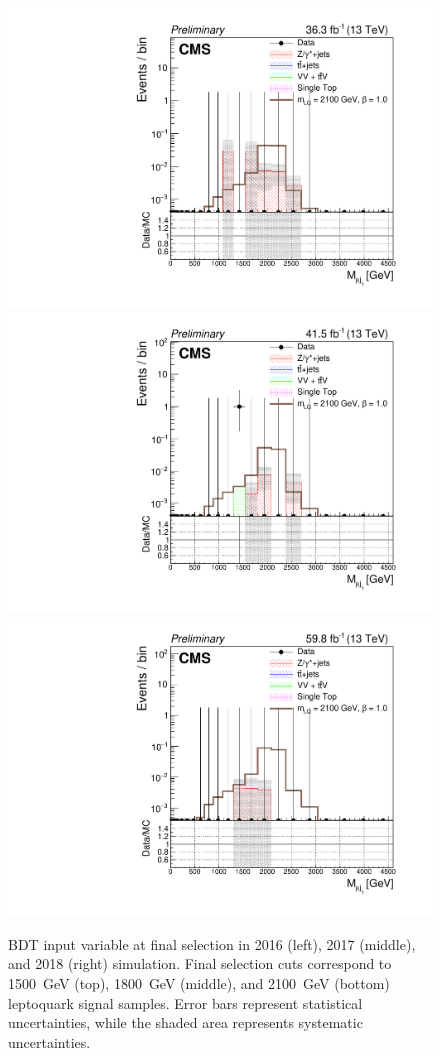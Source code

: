 \begin{figure}[H]
    {\includegraphics[width=.32\textwidth]{Images/Analysis/Results_2016_Unblinded/Plots/Final_selection/BasicLQ_uujj_M_uujj1_final2100.pdf}}
    {\includegraphics[width=.32\textwidth]{Images/Analysis/Results_2017_Unblinded/Plots/Final_selection/BasicLQ_uujj_M_uujj1_final2100.pdf}}
    {\includegraphics[width=.32\textwidth]{Images/Analysis/Results_2018_Unblinded/Plots/Final_selection/BasicLQ_uujj_M_uujj1_final2100.pdf}}
    \caption{BDT input variable \MujOne at final selection in 2016 (left), 2017 (middle), and 2018 (right) simulation. Final selection cuts correspond to \SI{1500}{GeV} (top), \SI{1800}{GeV} (middle), and \SI{2100}{GeV} (bottom) leptoquark signal samples. Error bars represent statistical uncertainties, while the shaded area represents systematic uncertainties.
    \label{figapp:finalSelMuujj1}}
\end{figure}
